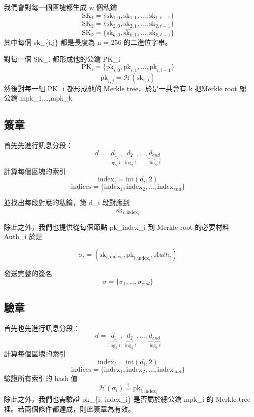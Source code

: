 \documentclass[
]{article}
\begin{document}
我們會對每一個區塊都生成 w 個私鑰 \[
\mathrm{SK}_{1}=\{\mathrm{sk}_{1,0},\mathrm{sk}_{1,1},\dots,\mathrm{sk}_{1,t-1}\}
\] \[
\mathrm{SK}_{2}=\{\mathrm{sk}_{2,0},\mathrm{sk}_{2,1},\dots,\mathrm{sk}_{2,t-1}\}
\] \[
\dots
\] \[
\mathrm{SK}_{k}=\{\mathrm{sk}_{k,0},\mathrm{sk}_{k,1},\dots,\mathrm{sk}_{k,t-1}\}
\] 其中每個 sk\_\{i,j\} 都是長度為 n = 256 的二進位字串。

對每一個 SK\_i 都形成他的公鑰 PK\_i \[
\mathrm{PK}_{i}=\{\mathrm{pk}_{i,0},\mathrm{pk}_{i,1},\dots,\mathrm{pk}_{i,t-1}\}
\] \[
\mathrm{pk}_{i,j}= \mathcal{H}(\mathrm{sk}_{i,j})
\] 然後對每一組 PK\_i 都形成他的 Merkle tree，於是一共會有 k 把Merkle
root 總公鑰 mpk\_1,\ldots,mpk\_k

\hypertarget{ux7c3dux7ae0}{%
\subsection{簽章}\label{ux7c3dux7ae0}}

首先先進行訊息分段： \[
d = \underbrace{ d_{1} }_{ \log_{2}t },\underbrace{ d_{2} }_{ \log_{2}t},\dots,\underbrace{ d_{end} }_{ \log_{2}t}
\] 計算每個區塊的索引 \[
\mathrm{index}_{i} = \mathrm{int}(d_{i},2)
\] \[
\mathrm{indices} = \{ \mathrm{index}_{1},\mathrm{index}_{2},\dots, \mathrm{index}_{end}\}
\]

並找出每段對應的私鑰，第 d\_i 段對應到 \[
\mathrm{sk}_{i,\mathrm{index}_{i}}
\]

除此之外，我們也提供從每個節點 pk\_index\_i 到 Merkle root 的必要材料
Auth\_i 於是

\[
\sigma_{i} = (\mathrm{sk}_{i,\mathrm{index}_{i}},\mathrm{pk}_{i,\mathrm{index}_{i}}, Auth_{i})
\]

發送完整的簽名 \[
\sigma 
= \{\sigma_{1},\dots,\sigma_{end}\}
\]

\hypertarget{ux9a57ux7ae0-1}{%
\subsection{驗章}\label{ux9a57ux7ae0-1}}

首先也先進行訊息分段： \[
d = \underbrace{ d_{1} }_{ \log_{2}t },\underbrace{ d_{2} }_{ \log_{2}t},\dots,\underbrace{ d_{end} }_{ \log_{2}t}
\] 計算每個區塊的索引 \[
\mathrm{index}_{i} = \mathrm{int}(d_{i},2)
\] \[
\mathrm{indices} = \{ \mathrm{index}_{1},\mathrm{index}_{2},\dots, \mathrm{index}_{end}\}
\] 驗證所有索引的 hash 值 \[
\mathcal{H}(\sigma_{i}) 
\overset{?}{=} \mathrm{pk}_{i,\mathrm{index}_{i}} 
\] 除此之外，我們也需驗證 pk\_\{i, index\_i\} 是否屬於總公鑰 mpk\_i 的
Merkle tree 裡。若兩個條件都達成，則此簽章為有效。
\end{document}
